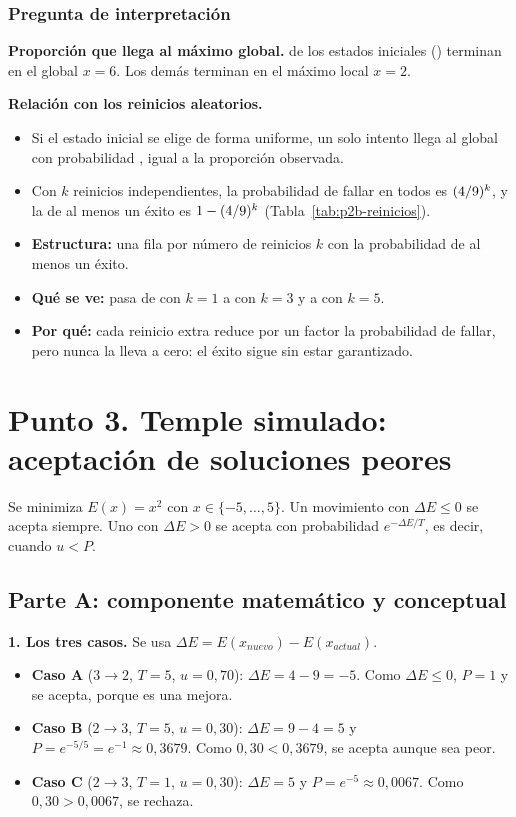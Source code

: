\documentclass[12pt,a4paper]{article}
\newcommand{\comoleerla}[3]{%
  \begin{center}\footnotesize
  \begin{minipage}{0.94\linewidth}
  \begin{itemize}\setlength{\itemsep}{0pt}\setlength{\topsep}{2pt}%
    \setlength{\parsep}{0pt}
  \item \textbf{Estructura:} #1
  \item \textbf{Qué se ve:} #2
  \item \textbf{Por qué:} #3
  \end{itemize}
  \end{minipage}
  \end{center}}
\begin{document}
\subsubsection{Pregunta de interpretación}

\textbf{Proporción que llega al máximo global.} \PdosExitos{} de los
\PdosTotal{} estados iniciales (\PdosProporcion{}) terminan en el global
$x=6$. Los demás terminan en el máximo local $x=2$.

\textbf{Relación con los reinicios aleatorios.}
\begin{itemize}
  \item Si el estado inicial se elige de forma uniforme, un solo intento
  llega al global con probabilidad \PdosFrac{}, igual a la proporción observada.
  \item Con $k$ reinicios independientes, la probabilidad de fallar en todos
  es $(4/9)^k$, y la de al menos un éxito es $1-(4/9)^k$
  (Tabla~\ref{tab:p2b-reinicios}).
\end{itemize}


\comoleerla
{una fila por número de reinicios $k$ con la probabilidad de al menos un
éxito.}
{pasa de \PdosProbUno{} con $k=1$ a \PdosProbTres{} con $k=3$ y a
\PdosProbCinco{} con $k=5$.}
{cada reinicio extra reduce por un factor \PdosFalloFrac{} la probabilidad de fallar,
pero nunca la lleva a cero: el éxito sigue sin estar garantizado.}

\section{Punto 3. Temple simulado: aceptación de soluciones peores}

Se minimiza $E(x)=x^2$ con $x\in\{-5,\dots,5\}$. Un movimiento con
$\Delta E\le0$ se acepta siempre. Uno con $\Delta E>0$ se acepta con
probabilidad $e^{-\Delta E/T}$, es decir, cuando $u<P$.

\subsection{Parte A: componente matemático y conceptual}

\noindent\textbf{1. Los tres casos.} Se usa $\Delta E=E(x_{nuevo})-E(x_{actual})$.
\begin{itemize}
  \item \textbf{Caso A} ($3\to2$, $T=5$, $u=0{,}70$): $\Delta E=4-9=-5$.
  Como $\Delta E\le0$, $P=1$ y se acepta, porque es una mejora.
  \item \textbf{Caso B} ($2\to3$, $T=5$, $u=0{,}30$): $\Delta E=9-4=5$ y
  $P=e^{-5/5}=e^{-1}\approx0{,}3679$. Como $0{,}30<0{,}3679$, se acepta
  aunque sea peor.
  \item \textbf{Caso C} ($2\to3$, $T=1$, $u=0{,}30$): $\Delta E=5$ y
  $P=e^{-5}\approx0{,}0067$. Como $0{,}30>0{,}0067$, se rechaza.
\end{itemize}
\end{document}
